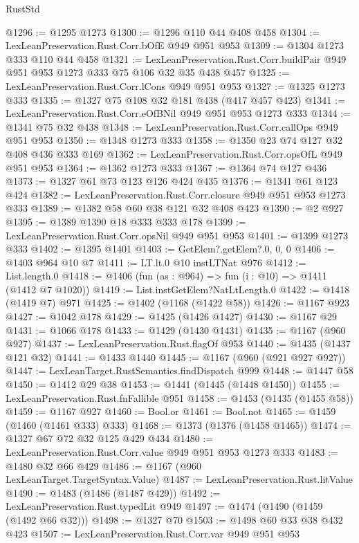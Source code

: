\begin{lexlean}{RustStd}
\begin{coremodule}
@1296 := @1295 @1273
@1300 := @1296 @110 @44 @408 @458
@1304 := LexLeanPreservation.Rust.Corr.bOfE @949 @951 @953
@1309 := @1304 @1273 @333 @110 @44 @458
@1321 := LexLeanPreservation.Rust.Corr.buildPair
    @949
    @951
    @953
    @1273
    @333
    @75
    @106
    @32
    @35
    @438
    @457
@1325 := LexLeanPreservation.Rust.Corr.lCons @949 @951 @953
@1327 := @1325 @1273 @333
@1335 := @1327 @75 @108 @32 @181 @438 (@417 @457 @423)
@1341 := LexLeanPreservation.Rust.Corr.eOfBNil @949 @951 @953 @1273 @333
@1344 := @1341 @75 @32 @438
@1348 := LexLeanPreservation.Rust.Corr.callOps @949 @951 @953
@1350 := @1348 @1273 @333
@1358 := @1350 @23 @74 @127 @32 @408 @436 @333 @169
@1362 := LexLeanPreservation.Rust.Corr.opsOfL @949 @951 @953
@1364 := @1362 @1273 @333
@1367 := @1364 @74 @127 @436
@1373 := @1327 @61 @73 @123 @126 @424 @435
@1376 := @1341 @61 @123 @424
@1382 := LexLeanPreservation.Rust.Corr.closure @949 @951 @953 @1273 @333
@1389 := @1382 @58 @60 @38 @121 @32 @408 @423
@1390 := @2 @927
@1395 := @1389 @1390 @18 @333 @333 @178
@1399 := LexLeanPreservation.Rust.Corr.opsNil @949 @951 @953
@1401 := @1399 @1273 @333
@1402 := @1395 @1401
@1403 := GetElem?.getElem?.{0, 0, 0}
@1406 := @1403 @964 @10 @7
@1411 := LT.lt.{0} @10 instLTNat @976
@1412 := List.length.{0}
@1418 := @1406 (fun (as : @964) => fun (i : @10) => @1411 (@1412 @7 @1020))
@1419 := List.instGetElem?NatLtLength.{0}
@1422 := @1418 (@1419 @7) @971
@1425 := @1402 (@1168 (@1422 @58))
@1426 := @1167 @923
@1427 := @1042 @178
@1429 := @1425 (@1426 @1427)
@1430 := @1167 @29
@1431 := @1066 @178
@1433 := @1429 (@1430 @1431)
@1435 := @1167 (@960 @927)
@1437 := LexLeanPreservation.Rust.flagOf @953
@1440 := @1435 (@1437 @121 @32)
@1441 := @1433 @1440
@1445 := @1167 (@960 (@921 @927 @927))
@1447 := LexLeanTarget.RustSemantics.findDispatch @999
@1448 := @1447 @58
@1450 := @1412 @29 @38
@1453 := @1441 (@1445 (@1448 @1450))
@1455 := LexLeanPreservation.Rust.fnFallible @951
@1458 := @1453 (@1435 (@1455 @58))
@1459 := @1167 @927
@1460 := Bool.or
@1461 := Bool.not
@1465 := @1459 (@1460 (@1461 @333) @333)
@1468 := @1373 (@1376 (@1458 @1465))
@1474 := @1327 @67 @72 @32 @125 @429 @434
@1480 := LexLeanPreservation.Rust.Corr.value @949 @951 @953 @1273 @333
@1483 := @1480 @32 @66 @429
@1486 := @1167 (@960 LexLeanTarget.TargetSyntax.Value)
@1487 := LexLeanPreservation.Rust.litValue
@1490 := @1483 (@1486 (@1487 @429))
@1492 := LexLeanPreservation.Rust.typedLit @949
@1497 := @1474 (@1490 (@1459 (@1492 @66 @32)))
@1498 := @1327 @70
@1503 := @1498 @60 @33 @38 @432 @423
@1507 := LexLeanPreservation.Rust.Corr.var @949 @951 @953

\end{coremodule}
\end{lexlean}
